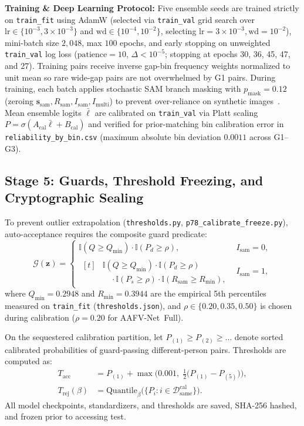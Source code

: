 \documentclass[journal]{IEEEtran}
\newcommand{\sys}{AAFV-Net}
\newcommand{\vect}[1]{\mathbf{#1}}
\begin{document}
\textbf{Training \& Deep Learning Protocol:} Five ensemble seeds are trained strictly on \texttt{train\_fit} using AdamW (selected via \texttt{train\_val} grid search over $\text{lr} \in \{10^{-3}, 3\times 10^{-3}\}$ and $\text{wd} \in \{10^{-4}, 10^{-2}\}$, selecting $\text{lr}=3\times 10^{-3}, \text{wd}=10^{-2}$), mini-batch size $2{,}048$, max $100$ epochs, and early stopping on unweighted \texttt{train\_val} log loss ($\text{patience} = 10$, $\Delta < 10^{-5}$; stopping at epochs 30, 36, 45, 47, and 27). Training pairs receive inverse gap-bin frequency weights normalized to unit mean so rare wide-gap pairs are not overwhelmed by G1 pairs. During training, each batch applies stochastic SAM branch masking with $p_{\text{mask}} = 0.12$ (zeroing $\vect{s}_{\text{sam}}, R_{\text{sam}}, I_{\text{sam}}, I_{\text{multi}}$) to prevent over-reliance on synthetic images~\cite{poh2009quality}. Mean ensemble logits $\bar{\ell}$ are calibrated on \texttt{train\_val} via Platt scaling $P = \sigma(A_{\text{cal}}\bar{\ell} + B_{\text{cal}})$ and verified for prior-matching bin calibration error in \texttt{reliability\_by\_bin.csv} (maximum absolute bin deviation $0.0011$ across G1--G3).

\subsection{Stage 5: Guards, Threshold Freezing, and Cryptographic Sealing}
To prevent outlier extrapolation (\texttt{thresholds.py}, \texttt{p78\_calibrate\_freeze.py}), auto-acceptance requires the composite guard predicate:
\begin{equation}
\mathcal{G}(\vect{z}) =
\begin{cases}
\mathbb{I}(Q \ge Q_{\min}) \cdot \mathbb{I}(P_d \ge \rho), & I_{\text{sam}} = 0, \\
\begin{aligned}[t]
&\mathbb{I}(Q \ge Q_{\min}) \cdot \mathbb{I}(P_d \ge \rho) \\
&\quad \cdot \mathbb{I}(P_s \ge \rho) \cdot \mathbb{I}(R_{\text{sam}} \ge R_{\min}),
\end{aligned} & I_{\text{sam}} = 1,
\end{cases}
\end{equation}
where $Q_{\min} = 0.2948$ and $R_{\min} = 0.3944$ are the empirical 5th percentiles measured on \texttt{train\_fit} (\texttt{thresholds.json}), and $\rho \in \{0.20, 0.35, 0.50\}$ is chosen during calibration ($\rho = 0.20$ for \sys\ Full).

On the sequestered calibration partition, let $P_{(1)} \ge P_{(2)} \ge \dots$ denote sorted calibrated probabilities of guard-passing different-person pairs. Thresholds are computed as:
\begin{align}
T_{\text{acc}} &= P_{(1)} + \max\Big(0.001,\; \frac{1}{2}\big(P_{(1)} - P_{(5)}\big)\Big), \\
T_{\text{rej}}(\beta) &= \text{Quantile}_{\beta}\big(\{P_i : i \in \mathcal{D}_{\text{same}}^{\text{cal}}\}\big).
\end{align}
All model checkpoints, standardizers, and thresholds are saved, SHA-256 hashed, and frozen prior to accessing test.
\end{document}
